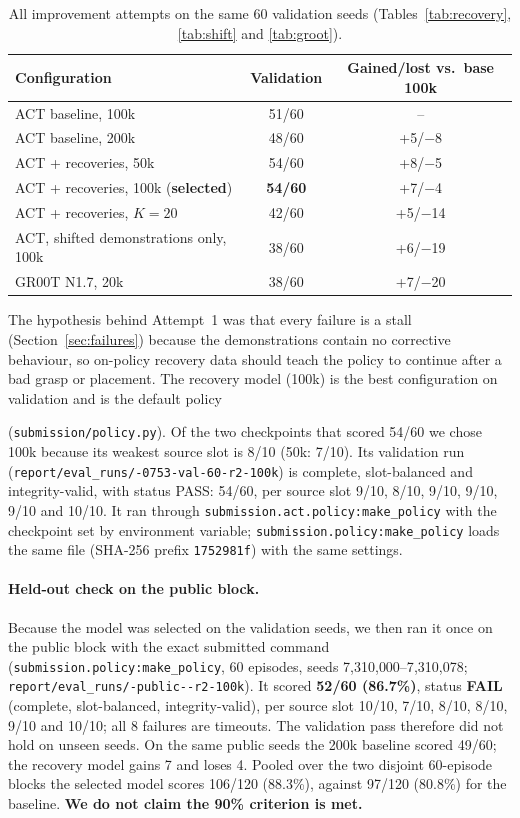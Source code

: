\documentclass[11pt,a4paper]{article}
\begin{document}
\begin{table}[h]
\centering
\begin{tabular}{lcc}
\toprule
Configuration & Validation & Gained/lost vs.\ base 100k \\
\midrule
ACT baseline, 100k & 51/60 & -- \\
ACT baseline, 200k & 48/60 & +5/$-$8 \\
ACT + recoveries, 50k & 54/60 & +8/$-$5 \\
ACT + recoveries, 100k (\textbf{selected}) & \textbf{54/60} & +7/$-$4 \\
ACT + recoveries, $K=20$ & 42/60 & +5/$-$14 \\
ACT, shifted demonstrations only, 100k & 38/60 & +6/$-$19 \\
GR00T N1.7, 20k & 38/60 & +7/$-$20 \\
\bottomrule
\end{tabular}
\caption{All improvement attempts on the same 60 validation seeds
(Tables~\ref{tab:recovery}, \ref{tab:shift} and \ref{tab:groot}).}
\label{tab:summary}
\end{table}

The hypothesis behind Attempt~1 was that every failure is a stall
(Section~\ref{sec:failures}) because the demonstrations contain no
corrective behaviour, so on-policy recovery data should teach the policy to
continue after a bad grasp or placement. The recovery model (100k)
is the best configuration on validation and is the default policy
{\sloppy(\texttt{submission/policy.py}). Of the two checkpoints that
scored 54/60 we chose 100k because its weakest source slot is 8/10 (50k: 7/10).
Its validation run
(\texttt{report/\allowbreak eval\_runs/-0753-val-60-r2-100k}) is complete,
slot-balanced and integrity-valid, with status PASS: 54/60, per source slot
9/10, 8/10, 9/10, 9/10, 9/10 and 10/10. It ran
through \texttt{submission.\allowbreak act.\allowbreak policy:\allowbreak make\_policy} with the checkpoint set
by environment variable; \texttt{submission.policy:make\_policy} loads the
same file (SHA-256 prefix \texttt{1752981f}) with the same settings.\par}

\paragraph{Held-out check on the public block.} {\sloppy Because the model was
selected on the validation seeds, we then ran it once on the public block
with the exact submitted command
(\texttt{submission.policy:\allowbreak make\_policy}, 60 episodes, seeds
7{,}310{,}000--7{,}310{,}078; \texttt{report/\allowbreak eval\_runs/-public--r2-100k}).
It scored \textbf{52/60 (86.7\%)}, status \textbf{FAIL} (complete,
slot-balanced, integrity-valid), per source slot 10/10, 7/10, 8/10, 8/10,
9/10 and 10/10; all 8 failures are timeouts. The validation pass therefore
did not hold on unseen seeds. On the same public seeds the 200k baseline
scored 49/60; the recovery model gains 7 and loses 4. Pooled over the two
disjoint 60-episode blocks the selected model scores 106/120 (88.3\%),
against 97/120 (80.8\%) for the baseline. \textbf{We do not claim the 90\%
criterion is met.}\par}
\end{document}
